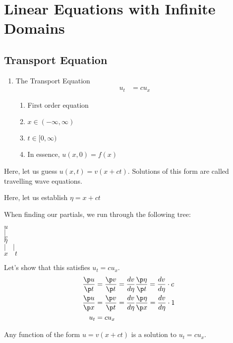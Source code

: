 \newpage
\section{Linear Equations with Infinite Domains}

\subsection{Transport Equation}

\begin{enumerate}
  \item The Transport Equation
  \begin{align}
    u_t & = cu_x
  \end{align}
  \begin{enumerate}
    \item First order equation
    \item $x \in (-\infty, \infty)$
    \item $t \in [0, \infty)$
    \item In essence, $u(x, 0) = f(x)$
  \end{enumerate}
\end{enumerate}
  \bigbreak

  Here, let us guess $u(x, t) = v(x + ct)$. Solutions of this form are called travelling wave equations.

  Here, let us establish $\eta = x + ct$

  When finding our partials, we run through the following tree:

  \begin{center}
    $u$\\
    $|$\\
    $v$\\
    $\eta$\\
    $| \quad |$\\
    $x \quad t$
  \end{center}

  Let's show that this satisfies $u_t = cu_x$.
  \begin{align}
    \frac{\p u}{\p t} & = \frac{\p v}{\p t} = \frac{dv}{d\eta} \frac{\p \eta}{\p t} = \frac{dv}{d \eta} \cdot c\\
    \frac{\p u}{\p x} & = \frac{\p v}{\p t} = \frac{dv}{d \eta} \frac{\p \eta}{\p x} = \frac{dv}{d \eta} \cdot 1\\
    u_t & = cu_x
  \end{align}

  Any function of the form $u = v(x + ct)$ is a solution to $u_t = cu_x$.


